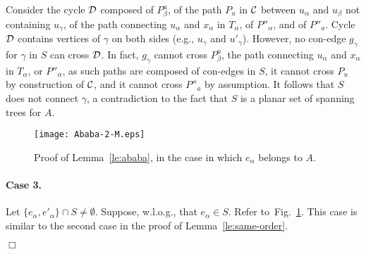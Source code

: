 \documentclass[letter,runningheads]{llncs}
\renewenvironment{proof}
{{\em Proof.\ }}{\hspace*{\fill}$\Box$\par\vspace{2mm}}
\begin{document}
\begin{proof}
Consider the cycle ${\cal D}$ composed of $P^u_{\beta}$, of the path $P_u$ in $\cal C$ between $u_{\alpha}$ and $u_{\beta}$ not containing $u_{\gamma}$, of the path connecting $u_{\alpha}$ and $x_{\alpha}$ in $T_{\alpha}$, of $P''_{\alpha}$, and of $P''_a$. Cycle ${\cal D}$ contains vertices of $\gamma$ on both sides (e.g., $u_{\gamma}$ and $u'_{\gamma}$). However, no con-edge $g_{\gamma}$ for $\gamma$ in $S$ can cross ${\cal D}$. In fact, $g_{\gamma}$ cannot cross $P^u_{\beta}$, the path connecting $u_{\alpha}$ and $x_{\alpha}$ in $T_{\alpha}$, or $P''_{\alpha}$, as such paths are composed of con-edges in $S$, it cannot cross $P_u$ by construction of $\cal C$, and it cannot cross $P''_a$ by assumption. It follows that $S$ does not connect $\gamma$, a contradiction to the fact that $S$ is a planar set of spanning trees for $A$.

\begin{figure}[tb]
\begin{center}
\mbox{\texttt{[image: Ababa-2-M.eps]}}
\caption{Proof of Lemma~\ref{le:ababa}, in the case in which $e_{\alpha}$ belongs to $A$.}
\label{fig:ababa-2}
\end{center}
\end{figure}

\paragraph{Case 3.} Let $\{e_{\alpha},e'_{\alpha}\}\cap S\neq \emptyset$. Suppose, w.l.o.g., that $e_{\alpha}\in S$. Refer to~Fig.~\ref{fig:ababa-2}. This case is similar to the second case in the proof of Lemma~\ref{le:same-order}.


\end{proof}
\end{document}
